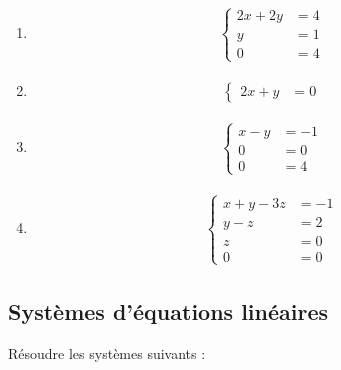\documentclass[11pt,a4paper]{report}
\begin{document}
\begin{multicols}{3}
\begin{enumerate}[label=\alph*)]
  \item 
  \begin{align*}
    \begin{cases}
      2x + 2y &= 4\\
      y &= 1\\
      0 &= 4
    \end{cases}
  \end{align*}

  \item 
  \begin{align*}
    \begin{cases}
      2x + y &= 0
    \end{cases}
  \end{align*}

  \item 
  \begin{align*}
    \begin{cases}
      x - y &= -1\\
      0 &= 0\\
      0 &= 4
    \end{cases}
  \end{align*}

  \item 
  \begin{align*}
    \begin{cases}
      x + y - 3z &= -1\\
      y - z &= 2\\
      z &= 0\\
      0 &= 0
    \end{cases}
  \end{align*}
\end{enumerate}
\end{multicols}

\subsection{Systèmes d'équations linéaires}
Résoudre les systèmes suivants :
\end{document}
